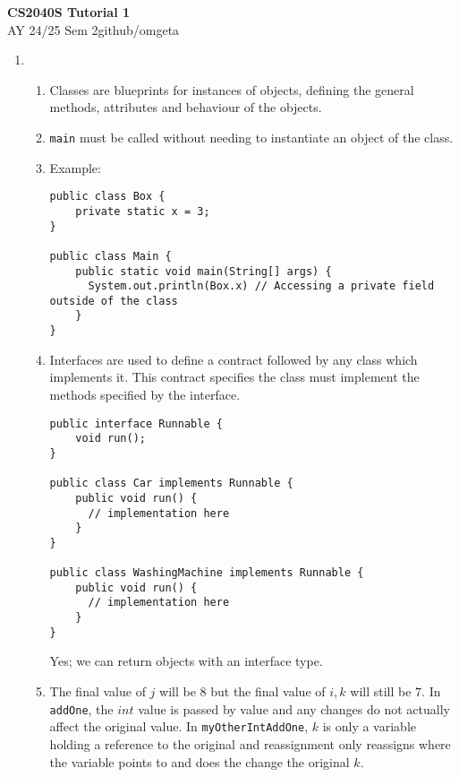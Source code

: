 \documentclass[12pt, a4paper]{article}
\newcommand{\mytitle}{CS2040S Tutorial 1}
\newcommand{\myauthor}{github/omgeta}
\newcommand{\mydate}{AY 24/25 Sem 2}
\begin{document}
\raggedright
\footnotesize
\begin{center}
{\normalsize{\textbf{\mytitle}}} \\
{\footnotesize{\mydate\hspace{2pt}\textemdash\hspace{2pt}\myauthor}}
\end{center}
\begin{enumerate}[Q\arabic*.]
  \item 
    \begin{enumerate}[(\alph*.)]
      \item Classes are blueprints for instances of objects, defining the general methods, attributes and behaviour of the objects. 

      \item \lstinline|main| must be called without needing to instantiate an object of the class. 

      \item Example: 
        \begin{lstlisting}
public class Box {
    private static x = 3;
}

public class Main {
    public static void main(String[] args) {
      System.out.println(Box.x) // Accessing a private field outside of the class
    }
} 
        \end{lstlisting}

      \item Interfaces are used to define a contract followed by any class which implements it. This contract specifies the class must implement the methods specified by the interface. 
        \begin{lstlisting}
public interface Runnable {
    void run();
}

public class Car implements Runnable {
    public void run() {
      // implementation here
    }
}

public class WashingMachine implements Runnable {
    public void run() {
      // implementation here
    }
}
        \end{lstlisting}
        Yes; we can return objects with an interface type.

      \item The final value of $j$ will be $8$ but the final value of $i, k$ will still be $7$. In \lstinline|addOne|, the $int$ value is passed by value and any changes do not actually affect the original value. In \lstinline|myOtherIntAddOne|, $k$ is only a variable holding a reference to the original and reassignment only reassigns where the variable points to and does the change the original $k$.


\end{enumerate}
\end{enumerate}
\end{document}
